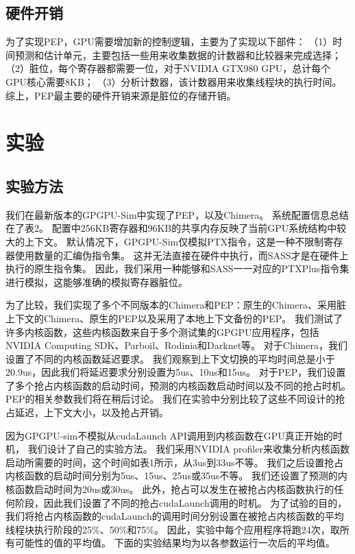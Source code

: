 \subsection{硬件开销}
为了实现PEP，GPU需要增加新的控制逻辑，主要为了实现以下部件：
（1）时间预测和估计单元，主要包括一些用来收集数据的计数器和比较器来完成选择；
（2）脏位，每个寄存器都需要一位，对于NVIDIA GTX980 GPU，总计每个GPU核心需要8KB；
（3）分析计数器，该计数器用来收集线程块的执行时间。
综上，PEP最主要的硬件开销来源是脏位的存储开销。


\section{实验}

\subsection{实验方法}
我们在最新版本的GPGPU-Sim中实现了PEP，以及Chimera。
系统配置信息总结在了表2。
配置中256KB寄存器和96KB的共享内存反映了当前GPU系统结构中较大的上下文。
默认情况下，GPGPU-Sim仅模拟PTX指令，这是一种不限制寄存器使用数量的汇编伪指令集。
这并无法直接在硬件中执行，而SASS才是在硬件上执行的原生指令集。
因此，我们采用一种能够和SASS一一对应的PTXPlus指令集进行模拟，这能够准确的模拟寄存器脏位。

为了比较，我们实现了多个不同版本的Chimera和PEP：原生的Chimera、采用脏上下文的Chimera、原生的PEP以及采用了本地上下文备份的PEP。
我们测试了许多内核函数，这些内核函数来自于多个测试集的GPGPU应用程序，包括NVIDIA Computing SDK、Parboil、Rodinia和Darknet等。
对于Chimera，我们设置了不同的内核函数延迟要求。
我们观察到上下文切换的平均时间总是小于20.9us，因此我们将延迟要求分别设置为5us、10us和15us。
对于PEP，我们设置了多个抢占内核函数的启动时间，预测的内核函数启动时间以及不同的抢占时机。
PEP的相关参数我们将在稍后讨论。
我们在实验中分别比较了这些不同设计的抢占延迟，上下文大小，以及抢占开销。

因为GPGPU-sim不模拟从cudaLaunch API调用到内核函数在GPU真正开始的时机，
我们设计了自己的实验方法。
我们采用NVIDIA profiler来收集分析内核函数启动所需要的时间，这个时间如表1所示，从3us到33us不等。
我们之后设置抢占内核函数的启动时间分别为5us、15us、25us或35us不等。
我们还设置了预测的内核函数启动时间为20us或30us。
此外，抢占可以发生在被抢占内核函数执行的任何阶段，因此我们设置了不同的抢占cudaLaunch调用的时机。
为了试验的目的，我们将抢占内核函数的cudaLaunch的调用时间分别设置在被抢占内核函数的平均线程块执行阶段的25\%、50\%和75\%。
因此，实验中每个应用程序将跑24次，取所有可能性的值的平均值。
下面的实验结果均为以各参数运行一次后的平均值。


